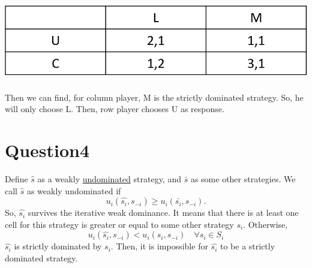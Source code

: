 \documentclass[12pt]{article}
\newcommand{\e}[1]{$ #1 $}
\begin{document}
\begin{spacing}{1.5}
            \begin{center}
                \includegraphics[scale = .5]{pic/2by2_game.png}
            \end{center}

            Then we can find, for column player, M is the strictly dominated strategy.
            So, he will only choose L. Then, row player chooses U as response.\\
    
    \section{Question4}

        Define $\hat{s}$ as a weakly \underline{undominated} strategy, and $\bar{s}$
        as some other strategies. We call $\hat{s}$ as weakly undominated if
        $$ u_i (\hat{s_i}, s_{-i}) \ge u_i(\bar{s_i}, s_{-i}).$$
        So,  $\hat{s_i}$ survives the iterative weak dominance. It means that there
        is at least one cell for this strategy is greater or equal to some other strategy $s_i$.
        Otherwise, $$u_i(\hat{s_i}, s_{-i}) < u_i(s_i, s_{-i}) \quad  \forall s_i\in S_i $$
        $\hat{s_i}$ is strictly dominated by $s_i$.
        Then, it is impossible for \e{\hat{s_i}} to be a strictly dominated strategy.
        
\end{spacing}
\end{document}
